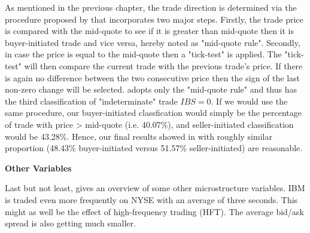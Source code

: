 As mentioned in the previous chapter, the trade direction is determined via the procedure proposed by \citet{leeready1991} that incorporates two major steps. Firstly, the trade price is compared with the mid-quote to see if it is greater than mid-quote then it is buyer-initiated trade and vice versa, hereby noted as "mid-quote rule". Secondly, in case the price is equal to the mid-quote then a "tick-test" is applied. The "tick-test" will then compare the current trade with the previous trade's price. If there is again no difference between the two consecutive price then the sign of the last non-zero change will be selected. \citet{hausman1992} adopts only the "mid-quote rule" and thus has the third classification of "indeterminate" trade $IBS = 0$. If we would use the same procedure, our buyer-initiated classfication would simply be the percentage of trade with price > mid-quote (i.e. 40.07\%), and seller-initiated classification would be 43.28\%. Hence, our final results showed in  with roughly similar proportion (48.43\% buyer-initiated versus 51.57\% seller-initiated) are reasonable.


\begin{table}[H]
\centering
{}
\caption{Summary statistics: Trade Direction}
\label{tab:table-5}
\end{table}

{\noindent\bfseries Other Variables }

Last but not least,  gives an overview of some other microstructure variables. IBM is traded even more frequently on NYSE with an average of three seconds. This might as well be the effect of high-frequency trading (HFT). The average bid/ask spread is also getting much smaller.













